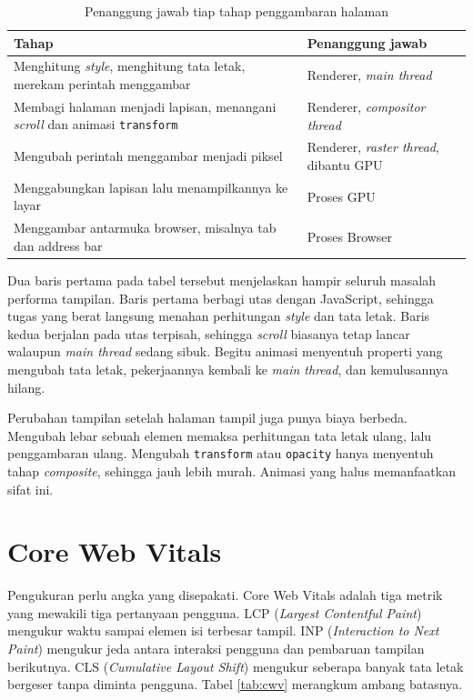 \begin{table}[!htb]
  \centering
  \caption{Penanggung jawab tiap tahap penggambaran halaman}
  \label{tab:penanggung-jawab-render}
  \begin{tabularx}{\textwidth}{Xl}
    \hline
    \textbf{Tahap} & \textbf{Penanggung jawab} \\
    \hline
    Menghitung \textit{style}, menghitung tata letak, merekam perintah menggambar & Renderer, \textit{main thread} \\
    \hline
    Membagi halaman menjadi lapisan, menangani \textit{scroll} dan animasi \texttt{transform} & Renderer, \textit{compositor thread} \\
    \hline
    Mengubah perintah menggambar menjadi piksel & Renderer, \textit{raster thread}, dibantu GPU \\
    \hline
    Menggabungkan lapisan lalu menampilkannya ke layar & Proses GPU \\
    \hline
    Menggambar antarmuka browser, misalnya tab dan address bar & Proses Browser \\
    \hline
  \end{tabularx}
\end{table}

Dua baris pertama pada tabel tersebut menjelaskan hampir seluruh masalah
performa tampilan. Baris pertama berbagi utas dengan JavaScript, sehingga tugas
yang berat langsung menahan perhitungan \textit{style} dan tata letak. Baris
kedua berjalan pada utas terpisah, sehingga \textit{scroll} biasanya tetap
lancar walaupun \textit{main thread} sedang sibuk. Begitu animasi menyentuh
properti yang mengubah tata letak, pekerjaannya kembali ke \textit{main thread},
dan kemulusannya hilang.

Perubahan tampilan setelah halaman tampil juga punya biaya berbeda. Mengubah
lebar sebuah elemen memaksa perhitungan tata letak ulang, lalu penggambaran
ulang. Mengubah \texttt{transform} atau \texttt{opacity} hanya menyentuh tahap
\textit{composite}, sehingga jauh lebih murah. Animasi yang halus memanfaatkan
sifat ini.

\section{Core Web Vitals}

Pengukuran perlu angka yang disepakati. Core Web Vitals \cite{webdev-vitals}
adalah tiga metrik yang mewakili tiga pertanyaan pengguna. LCP
(\textit{Largest Contentful Paint}) mengukur waktu sampai elemen isi terbesar
tampil. INP (\textit{Interaction to Next Paint}) mengukur jeda antara interaksi
pengguna dan pembaruan tampilan berikutnya. CLS (\textit{Cumulative Layout
Shift}) mengukur seberapa banyak tata letak bergeser tanpa diminta pengguna.
Tabel \ref{tab:cwv} merangkum ambang batasnya.

